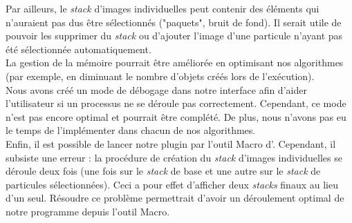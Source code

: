 Par ailleurs, le \textit{stack} d'images individuelles peut contenir des éléments qui n'auraient pas dus être sélectionnés ("paquets", bruit de fond). Il serait utile de pouvoir les supprimer du \textit{stack} ou d'ajouter l'image d'une particule n'ayant pas été sélectionnée automatiquement. \\

La gestion de la mémoire pourrait être améliorée en optimisant nos algorithmes (par exemple, en diminuant le nombre d'objets créés lors de l'exécution). \\

Nous avons créé un mode de débogage dans notre interface afin d'aider l'utilisateur si un processus ne se déroule pas correctement. Cependant, ce mode n'est pas encore optimal et pourrait être complété. De plus, nous n'avons pas eu le temps de l'implémenter dans chacun de nos algorithmes. \\

Enfin, il est possible de lancer notre plugin par l'outil Macro d'\imj. Cependant, il subsiste une erreur : la procédure de création du \textit{stack} d'images individuelles se déroule deux fois (une fois sur le \textit{stack} de base et une autre sur le \textit{stack} de particules sélectionnées). Ceci a pour effet d'afficher deux \textit{stacks} finaux au lieu d'un seul. Résoudre ce problème permettrait d'avoir un déroulement optimal de notre programme depuis l'outil Macro. 


















